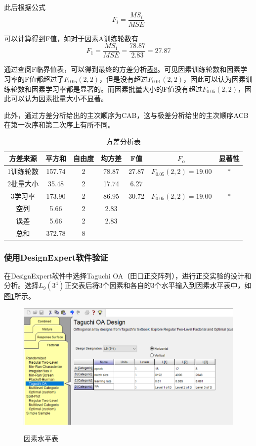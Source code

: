 \documentclass[UTF8]{ctexart}
\begin{document}
	此后根据公式
	\begin{equation*}
	F_i = \frac{MS_i}{MSE}
	\end{equation*}
	
	可以计算得到F值，如对于因素A训练轮数有
	\begin{equation*}
	F_1 = \frac{MS_1}{MSE} = \frac{78.87}{2.83} = 27.87
	\end{equation*}
	
	通过查阅F临界值表，可以得到最终的方差分析\hyperref[Chart.8]{表8}。可见因素训练轮数和因素学习率的F值都超过了$F_{0.05}(2, 2)$，但是没有超过$F_{0.01}(2, 2)$，因此可以认为因素训练轮数和因素学习率都是显著的。而因素批量大小的F值没有超过$F_{0.05}(2, 2)$，因此可以认为因素批量大小不显著。
	
	此外，通过方差分析给出的主次顺序为CAB，这与极差分析给出的主次顺序ACB在第一次序和第二次序上有所不同。
	
	\begin{table}[htbp]
		\centering
		\caption{方差分析表}
		\begin{tabular}{|c|c|c|c|c|c|c|}
			\hline
			方差来源 & 平方和 & 自由度 & 均方差 & F值 & $F_{\alpha}$ & 显著性 \\\hline
			1训练轮数 & 157.74 & 2 & 78.87 & 27.87 & $F_{0.05}(2, 2)=19.00$ & $*$\\\hline
			2批量大小 & 35.48 & 2 & 17.74 & 6.27 & &  \\\hline
			3学习率 & 173.90 & 2 & 86.95 & 30.72 & $F_{0.05}(2, 2)=19.00$ & $*$ \\\hline
			空列 & 5.66 & 2 & 2.83 & & & \\\hline
			误差 & 5.66 & 2 & 2.83 & & & \\\hline
			总和 & 372.78 & 8 & & & & \\\hline
		\end{tabular}%
		\label{Chart.8}%
	\end{table}%

	\subsubsection{使用DesignExpert软件验证}
	
	在DesignExpert软件中选择Taguchi OA（田口正交阵列），进行正交实验的设计和分析。选择$L_9(3^4)$正交表后将3个因素和各自的3个水平输入到因素水平表中，如\hyperref[Fig.1]{图1}所示。
	
	\begin{figure}[htbp]
		\centering
		\caption{因素水平表}
		\includegraphics[width=1.0\textwidth]{pic1.png}
		\label{Fig.1}
	\end{figure}
	
\end{document}
